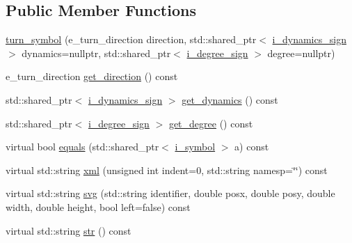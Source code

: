 \subsection*{Public Member Functions}
\begin{DoxyCompactItemize}
\item 
\hyperlink{classmae_1_1fl_1_1laban_1_1mv_1_1turn__symbol_a7b7f874e5277fb0122f9b219f03160e9}{turn\-\_\-symbol} (e\-\_\-turn\-\_\-direction direction, std\-::shared\-\_\-ptr$<$ \hyperlink{classmae_1_1fl_1_1laban_1_1mv_1_1i__dynamics__sign}{i\-\_\-dynamics\-\_\-sign} $>$ dynamics=nullptr, std\-::shared\-\_\-ptr$<$ \hyperlink{classmae_1_1fl_1_1laban_1_1mv_1_1i__degree__sign}{i\-\_\-degree\-\_\-sign} $>$ degree=nullptr)
\item 
e\-\_\-turn\-\_\-direction \hyperlink{classmae_1_1fl_1_1laban_1_1mv_1_1turn__symbol_a1e9aad7f2301dbd368858b57237fc8b7}{get\-\_\-direction} () const 
\item 
std\-::shared\-\_\-ptr$<$ \hyperlink{classmae_1_1fl_1_1laban_1_1mv_1_1i__dynamics__sign}{i\-\_\-dynamics\-\_\-sign} $>$ \hyperlink{classmae_1_1fl_1_1laban_1_1mv_1_1turn__symbol_ae9a052b0499ae07cbec21f7a224e31a1}{get\-\_\-dynamics} () const 
\item 
std\-::shared\-\_\-ptr$<$ \hyperlink{classmae_1_1fl_1_1laban_1_1mv_1_1i__degree__sign}{i\-\_\-degree\-\_\-sign} $>$ \hyperlink{classmae_1_1fl_1_1laban_1_1mv_1_1turn__symbol_af3aaa2ffaa36f2097e2f236e62b0bb47}{get\-\_\-degree} () const 
\item 
virtual bool \hyperlink{classmae_1_1fl_1_1laban_1_1mv_1_1turn__symbol_aafc1b11568db52d9fa3fbc86a7c281c2}{equals} (std\-::shared\-\_\-ptr$<$ \hyperlink{classmae_1_1fl_1_1laban_1_1mv_1_1i__symbol}{i\-\_\-symbol} $>$ a) const 
\item 
virtual std\-::string \hyperlink{classmae_1_1fl_1_1laban_1_1mv_1_1turn__symbol_a4b404fcb4b74a4db80b47cabb7876afa}{xml} (unsigned int indent=0, std\-::string namesp=\char`\"{}\char`\"{}) const 
\item 
virtual std\-::string \hyperlink{classmae_1_1fl_1_1laban_1_1mv_1_1turn__symbol_a756844c1207460af1d2f08245f0128b9}{svg} (std\-::string identifier, double posx, double posy, double width, double height, bool left=false) const 
\item 
virtual std\-::string \hyperlink{classmae_1_1fl_1_1laban_1_1mv_1_1turn__symbol_a92bc9681ef076940af9412fde943cf0c}{str} () const 
\end{DoxyCompactItemize}

